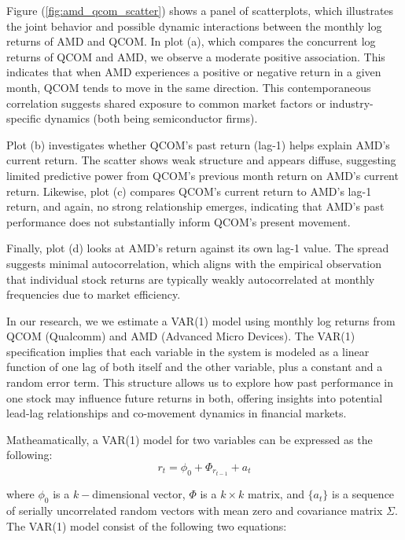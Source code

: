Figure (\ref{fig:amd_qcom_scatter}) shows a panel of scatterplots, which illustrates the joint behavior and possible dynamic interactions between the monthly log returns of AMD and QCOM. In plot (a), which compares the concurrent log returns of QCOM and AMD, we observe a moderate positive association. This indicates that when AMD experiences a positive or negative return in a given month, QCOM tends to move in the same direction. This contemporaneous correlation suggests shared exposure to common market factors or industry-specific dynamics (both being semiconductor firms).

Plot (b) investigates whether QCOM’s past return (lag-1) helps explain AMD’s current return. The scatter shows weak structure and appears diffuse, suggesting limited predictive power from QCOM’s previous month return on AMD's current return. Likewise, plot (c) compares QCOM’s current return to AMD’s lag-1 return, and again, no strong relationship emerges, indicating that AMD’s past performance does not substantially inform QCOM’s present movement.

Finally, plot (d) looks at AMD's return against its own lag-1 value. The spread suggests minimal autocorrelation, which aligns with the empirical observation that individual stock returns are typically weakly autocorrelated at monthly frequencies due to market efficiency.

In our research, we we estimate a VAR(1) model using monthly log returns from QCOM (Qualcomm) and AMD (Advanced Micro Devices). The VAR(1) specification implies that each variable in the system is modeled as a linear function of one lag of both itself and the other variable, plus a constant and a random error term. This structure allows us to explore how past performance in one stock may influence future returns in both, offering insights into potential lead-lag relationships and co-movement dynamics in financial markets.

Matheamatically, a VAR(1) model for two variables can be expressed as the following:
\begin{equation}
	r_t=\phi_0+\Phi_{r_{t-1}}+a_t
\end{equation}

where $\phi_0$ is a $k-$dimensional vector, $\Phi$ is a $k\times k$ matrix, and $\lbrace a_t\rbrace$ is a sequence of serially uncorrelated random vectors with mean zero and covariance matrix $\Sigma$. The VAR(1) model consist of the following two equations:

